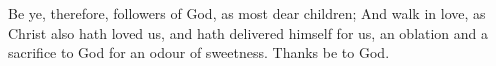 Be ye, therefore, followers of God, as most dear children; And walk in love, as Christ also hath loved us, and hath delivered himself for us, an oblation and a sacrifice to God for an odour of sweetness. \rubric{\Rbar} Thanks be to God.